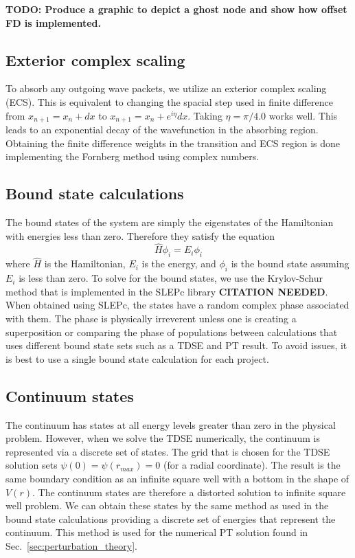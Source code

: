 \textbf{TODO: Produce a graphic to depict a ghost node and show how offset FD is implemented.}

\subsection{Exterior complex scaling} %
\label{sub:exterior_complex_scaling}
To absorb any outgoing wave packets, we utilize an exterior complex scaling (ECS). This is equivalent to changing the spacial step used in finite difference from $x_{n+1} = x_n+dx$ to $x_{n+1} = x_n+e^{i\eta}dx$. Taking $\eta=\pi / 4.0$ works well. This leads to an exponential decay of the wavefunction in the absorbing region. Obtaining the finite difference weights in the transition and ECS region is done implementing the Fornberg method \cite{Fornberg1988} using complex numbers.


\subsection{Bound state calculations} %
\label{sub:bound_state_calculations}
The bound states of the system are simply the eigenstates of the Hamiltonian with energies less than zero. Therefore they satisfy the equation 
\begin{equation}
    \hat{H} \phi_i = E_i \phi_i
\end{equation}
where $\hat{H}$ is the Hamiltonian, $E_i$ is the energy, and $\phi_i$ is the bound state assuming $E_i$ is less than zero. To solve for the bound states, we use the Krylov-Schur method that is implemented in the SLEPc library \textbf{CITATION NEEDED}. When obtained using SLEPc, the states have a random complex phase associated with them. The phase is physically irreverent unless one is creating a superposition or comparing the phase of populations between calculations that uses different bound state sets such as a TDSE and PT result. To avoid issues, it is best to use a single bound state calculation for each project.

\subsection{Continuum states} %
\label{sub:continuum_states}
The continuum has states at all energy levels greater than zero in the physical problem. However, when we solve the TDSE numerically, the continuum is represented via a discrete set of states. The grid that is chosen for the TDSE solution sets $\psi(0) = \psi(r_{max}) = 0$ (for a radial coordinate). The result is the same boundary condition as an infinite square well with a bottom in the shape of $V(r)$. The continuum states are therefore a distorted solution to infinite square well problem. We can obtain these states by the same method as used in the bound state calculations providing a discrete set of energies that represent the continuum. This method is used for the numerical PT solution found in Sec.~\ref{sec:perturbation_theory}.

